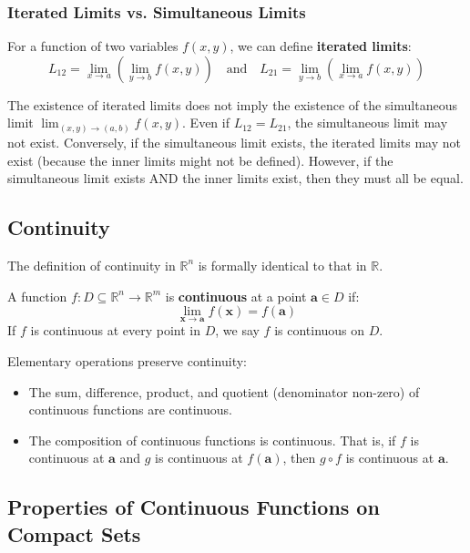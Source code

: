 \subsubsection{Iterated Limits vs. Simultaneous Limits}

For a function of two variables $f(x,y)$, we can define \textbf{iterated limits}:
\[ L_{12} = \lim_{x \to a} \left( \lim_{y \to b} f(x, y) \right) \quad \text{and} \quad L_{21} = \lim_{y \to b} \left( \lim_{x \to a} f(x, y) \right) \]

\begin{proposition}
The existence of iterated limits does not imply the existence of the simultaneous limit $\lim_{(x,y) \to (a,b)} f(x,y)$.
Even if $L_{12} = L_{21}$, the simultaneous limit may not exist.
Conversely, if the simultaneous limit exists, the iterated limits may not exist (because the inner limits might not be defined).
However, if the simultaneous limit exists AND the inner limits exist, then they must all be equal.
\end{proposition}

\subsection{Continuity}

The definition of continuity in $\mathbb{R}^n$ is formally identical to that in $\mathbb{R}$.

\begin{definition}[Continuity]
A function $f: D \subseteq \mathbb{R}^n \to \mathbb{R}^m$ is \textbf{continuous} at a point $\mathbf{a} \in D$ if:
\[ \lim_{\mathbf{x} \to \mathbf{a}} f(\mathbf{x}) = f(\mathbf{a}) \]
If $f$ is continuous at every point in $D$, we say $f$ is continuous on $D$.
\end{definition}

Elementary operations preserve continuity:
\begin{itemize}
    \item The sum, difference, product, and quotient (denominator non-zero) of continuous functions are continuous.
    \item The composition of continuous functions is continuous. That is, if $f$ is continuous at $\mathbf{a}$ and $g$ is continuous at $f(\mathbf{a})$, then $g \circ f$ is continuous at $\mathbf{a}$.
\end{itemize}

\subsection{Properties of Continuous Functions on Compact Sets}

